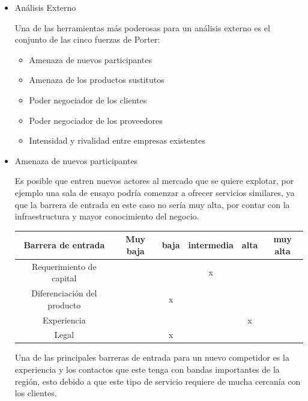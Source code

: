 \begin{itemize}

\item{Análisis Externo}


 Una de las herramientas más poderosas para un análisis externo es el conjunto de las cinco fuerzas de Porter:

\begin{itemize}
	\item Amenaza de nuevos participantes
	\item Amenaza de los productos sustitutos
	\item Poder negociador de los clientes
	\item Poder negociador de los proveedores
	\item Intensidad y rivalidad entre empresas existentes
\end{itemize}

\item Amenaza de nuevos participantes

    Es posible que entren nuevos actores al mercado que se quiere explotar, por ejemplo una sala de ensayo podría comenzar a ofrecer servicios similares, ya que la barrera de entrada en este caso no sería muy alta, por contar con la infraestructura y mayor conocimiento del negocio.

\vspace{0.5cm}
\begin{center}
\begin{tabular}{|c|c|c|c|c|c|}
\hline
Barrera de entrada          & Muy baja & baja & intermedia & alta & muy alta \\
\hline
Requerimiento de capital    &          &      & x          &      & \\
\hline
Diferenciación del producto &          & x    &            &      & \\
\hline
Experiencia                 &          &      &            & x    & \\
\hline
Legal                       &          & x    &            &      & \\
\hline
\end{tabular}
\end{center}
\vspace{0.5cm}

 Una de las principales barreras de entrada para un nuevo competidor es la experiencia y los contactos que este tenga con bandas importantes de la región, esto debido a que este tipo de servicio requiere de mucha cercanía con los clientes.


\end{itemize}
